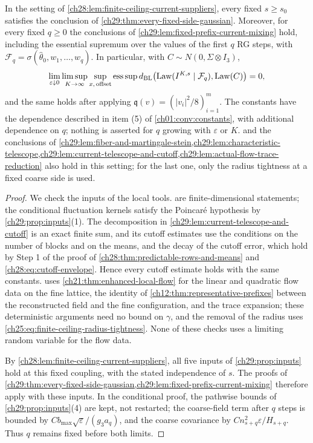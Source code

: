 \begin{lemma}\label{ch29:lem:finite-ceiling-prefix-gaussian}
In the setting of \cref{ch28:lem:finite-ceiling-current-suppliers}, every fixed $s\ge s_0$ satisfies the conclusion of \cref{ch29:thm:every-fixed-side-gaussian}. Moreover, for every fixed $q\ge0$ the conclusions of \cref{ch29:lem:fixed-prefix-current-mixing} hold, including the essential supremum over the values of the first $q$ RG steps, with $\mathcal F_q=\sigma(\widehat\theta_0,w_1,\dots,w_q)$. In particular, with $C\sim N(0,\Sigma\otimes I_3)$,
\[
 \lim_{\varepsilon\downarrow0}\limsup_{K\to\infty}\sup_{x,\,\text{offset}}\operatorname*{ess\,sup}d_{\mathrm{BL}}\bigl(\operatorname{Law}(I^{K,s}\mid\mathcal F_q),\operatorname{Law}(C)\bigr)=0,
\]
and the same holds after applying $\mathfrak q(v)=(|v_i|^2/8)_{i=1}^m$. The constants have the dependence described in item (5) of \cref{ch01:conv:constants}, with additional dependence on $q$; nothing is asserted for $q$ growing with $\varepsilon$ or $K$.  and the conclusions of \cref{ch29:lem:fiber-and-martingale-stein,ch29:lem:characteristic-telescope,ch29:lem:current-telescope-and-cutoff,ch29:lem:actual-flow-trace-reduction} also hold in this setting; for the last one, only the radius tightness at a fixed coarse side is used.
\end{lemma}

\begin{proof}
We check the inputs of the local tools.  are finite-dimensional statements; the conditional fluctuation kernels satisfy the Poincaré hypothesis by \cref{ch29:prop:inputs}(1). The decomposition in \cref{ch29:lem:current-telescope-and-cutoff} is an exact finite sum, and its cutoff estimates use the conditions on the number of blocks and on the means, and the decay of the cutoff error, which hold by Step 1 of the proof of \cref{ch28:thm:predictable-rows-and-means} and \eqref{ch28:eq:cutoff-envelope}. Hence every cutoff estimate holds with the same constants.  uses \cref{ch21:thm:enhanced-local-flow} for the linear and quadratic flow data on the fine lattice, the identity of \cref{ch12:thm:representative-prefixes} between the reconstructed field and the fine configuration, and the trace expansion; these deterministic arguments need no bound on $\gamma$, and the removal of the radius uses \eqref{ch25:eq:finite-ceiling-radius-tightness}. None of these checks uses a limiting random variable for the flow data.

By \cref{ch28:lem:finite-ceiling-current-suppliers}, all five inputs of \cref{ch29:prop:inputs} hold at this fixed coupling, with the stated independence of $s$. The proofs of \cref{ch29:thm:every-fixed-side-gaussian,ch29:lem:fixed-prefix-current-mixing} therefore apply with these inputs. In the conditional proof, the pathwise bounds of \cref{ch29:prop:inputs}(4) are kept, not restarted; the coarse-field term after $q$ steps is bounded by $Cb_{\max}\sqrt\varepsilon/(g_3a_q)$, and the coarse covariance by $Cn_{s+q}^2\varepsilon/H_{s+q}$. Thus $q$ remains fixed before both limits.
\end{proof}

